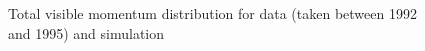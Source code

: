 \begin{figure}[htp!]
    \centering
    \caption{Total visible momentum distribution for data (taken between 1992 and 1995) and simulation %
    }
    \label{Figure:Selection-MercedesBenzRejection}
\end{figure}

\clearpage


